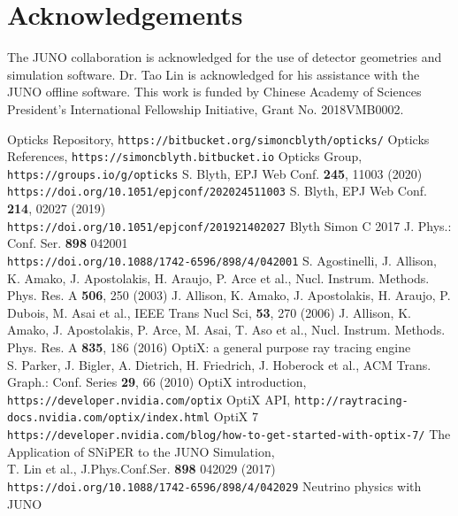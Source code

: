 \documentclass{webofc}
\begin{document}
\section*{Acknowledgements}
%
The JUNO collaboration is acknowledged for the use of detector 
geometries and simulation software. Dr. Tao Lin is acknowledged for his assistance with 
the JUNO offline software. 
This work is funded by Chinese Academy of Sciences President’s International Fellowship Initiative,
Grant No. 2018VMB0002.
%
%
%
\begin{thebibliography}{}
%
Opticks Repository, {\tt https://bitbucket.org/simoncblyth/opticks/}
Opticks References, {\tt https://simoncblyth.bitbucket.io}
Opticks Group, {\tt https://groups.io/g/opticks}
S. Blyth, EPJ Web Conf. {\bf 245}, 11003 (2020) \\
{\tt https://doi.org/10.1051/epjconf/202024511003}
S. Blyth, EPJ Web Conf. {\bf 214}, 02027 (2019) \\
{\tt https://doi.org/10.1051/epjconf/201921402027}
Blyth Simon C 2017 J. Phys.: Conf. Ser. {\bf 898} 042001 \\
{\tt https://doi.org/10.1088/1742-6596/898/4/042001}
%
%
%
%
%
%
%
S. Agostinelli, J. Allison, K. Amako, J. Apostolakis, H. Araujo, P. Arce et al., Nucl. Instrum. Methods. Phys. Res. A {\bf 506}, 250 (2003)
J. Allison, K. Amako, J. Apostolakis, H. Araujo, P. Dubois, M. Asai et al., IEEE Trans Nucl Sci, {\bf 53}, 270 (2006)
J. Allison, K. Amako, J. Apostolakis, P. Arce, M. Asai, T. Aso et al., Nucl. Instrum. Methods. Phys. Res. A {\bf 835}, 186 (2016)
%
%
%
%
%
OptiX: a general purpose ray tracing engine \\
S. Parker, J. Bigler, A. Dietrich, H. Friedrich, J. Hoberock et al., ACM Trans. Graph.: Conf. Series {\bf 29}, 66 (2010)
OptiX introduction, {\tt https://developer.nvidia.com/optix}
OptiX API, {\tt http://raytracing-docs.nvidia.com/optix/index.html}
%
OptiX 7 {\tt https://developer.nvidia.com/blog/how-to-get-started-with-optix-7/}
%
The Application of SNiPER to the JUNO Simulation,\\
T. Lin et al., J.Phys.Conf.Ser. {\bf 898} 042029 (2017)\\
{\tt https://doi.org/10.1088/1742-6596/898/4/042029}
%
Neutrino physics with JUNO \\

\end{thebibliography}
\end{document}
